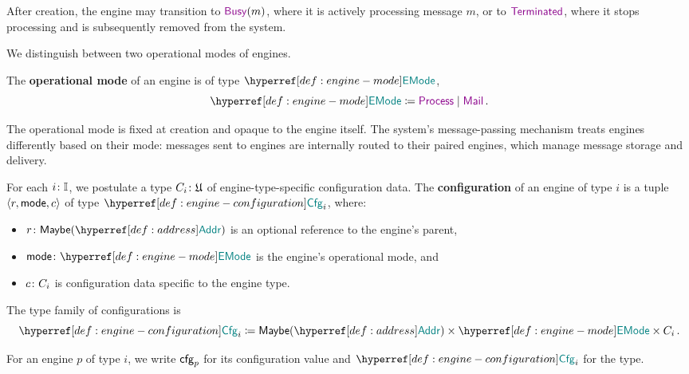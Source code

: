 \documentclass[
  a4paper,        %
  techreport,     %
]{art}
\begin{document}
After creation, the engine may transition to $\busy{m}$, where it is actively
processing message $m$, or to $\terminated$, where it stops processing and is
subsequently removed from the system.

We distinguish between two operational modes of engines.

\begin{definition}\label{def:engine-mode}%
The \textbf{operational mode} of an engine is of type $\EngineMode$,
\begin{equation}\label{eq:engine-mode}
\typedef{\EngineMode}
  {    \process
  \mid \mail
  }\,.
\end{equation}
\end{definition}

The operational mode is fixed at creation and opaque to the engine itself. The
system's message-passing mechanism treats engines differently based on their
mode: messages sent to \process{} engines are internally routed to their paired
\mail{} engines, which manage message storage and delivery.

\begin{definition}\label{def:engine-configuration}%
For each $i\colon\mathbb{I}$, we postulate a type $C_i\colon\mathfrak{U}$ of
engine-type-specific configuration data. The \textbf{configuration} of an
engine of type $i$ is a tuple $\langle r , \mathsf{mode} , c \rangle$ of type
$\configtype{i}$, where:
\begin{itemize}
    \item $\typing{r}{\Option{\Address}}$ is an optional reference to the
    engine's parent,
    \item $\typing{\mode}{\EngineMode}$ is the engine's operational mode, and
    \item $c\colon C_i$ is configuration data specific to the engine type.
\end{itemize}
The type family of configurations is
\begin{equation}\label{eq:engine-configuration-type}
\defequal{
  \configtype{i}
}{
         \Option{\Address}
  \times \EngineMode
  \times C_i
}\,.
\end{equation}
\end{definition}

For an engine $p$ of type $i$, we write $\mathsf{cfg}_{p}$ for its configuration
value and $\configtype{i}$ for the type.
\end{document}
